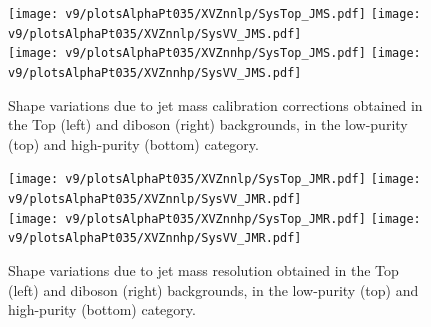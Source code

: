 \begin{figure}[!htb]
   \begin{center}
     \texttt{[image: v9/plotsAlphaPt035/XVZnnlp/SysTop\_JMS.pdf]}
     \texttt{[image: v9/plotsAlphaPt035/XVZnnlp/SysVV\_JMS.pdf]}
     \\
     \texttt{[image: v9/plotsAlphaPt035/XVZnnhp/SysTop\_JMS.pdf]}
     \texttt{[image: v9/plotsAlphaPt035/XVZnnhp/SysVV\_JMS.pdf]}

   \end{center}
   \caption{Shape variations due to jet mass calibration corrections obtained in the Top (left) and diboson (right) backgrounds, in the low-purity (top) and high-purity (bottom) category.}
   \label{fig:sysJMS}
 \end{figure}



 \begin{figure}[!htb]
   \begin{center}
     \texttt{[image: v9/plotsAlphaPt035/XVZnnlp/SysTop\_JMR.pdf]}
     \texttt{[image: v9/plotsAlphaPt035/XVZnnlp/SysVV\_JMR.pdf]}
     \\
     \texttt{[image: v9/plotsAlphaPt035/XVZnnhp/SysTop\_JMR.pdf]}
     \texttt{[image: v9/plotsAlphaPt035/XVZnnhp/SysVV\_JMR.pdf]}

   \end{center}
   \caption{Shape variations due to jet mass resolution obtained in the Top (left) and diboson (right) backgrounds, in the low-purity (top) and high-purity (bottom) category.}
   \label{fig:sysJMR}
 \end{figure}

